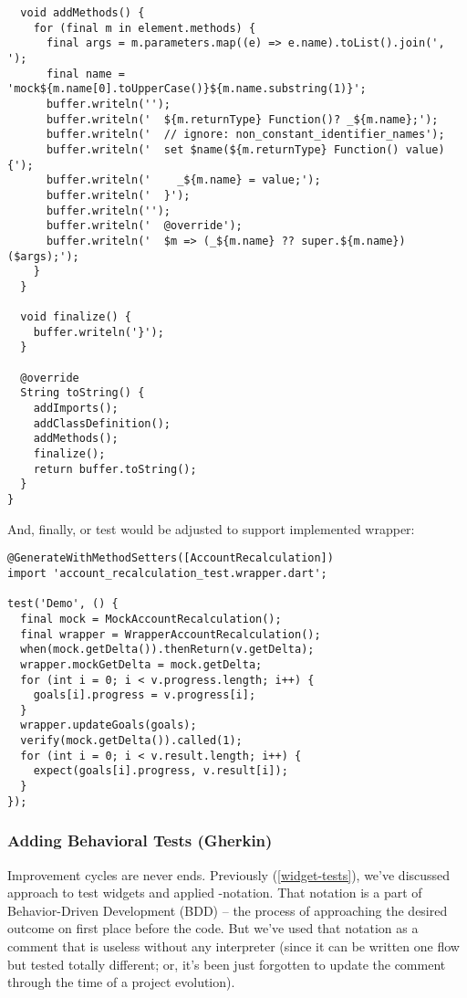 \begin{lstlisting}
  void addMethods() {
    for (final m in element.methods) {
      final args = m.parameters.map((e) => e.name).toList().join(', ');
      final name = 'mock${m.name[0].toUpperCase()}${m.name.substring(1)}';
      buffer.writeln('');
      buffer.writeln('  ${m.returnType} Function()? _${m.name};');
      buffer.writeln('  // ignore: non_constant_identifier_names');
      buffer.writeln('  set $name(${m.returnType} Function() value) {');
      buffer.writeln('    _${m.name} = value;');
      buffer.writeln('  }');
      buffer.writeln('');
      buffer.writeln('  @override');
      buffer.writeln('  $m => (_${m.name} ?? super.${m.name})($args);');
    }
  }

  void finalize() {
    buffer.writeln('}');
  }

  @override
  String toString() {
    addImports();
    addClassDefinition();
    addMethods();
    finalize();
    return buffer.toString();
  }
}
\end{lstlisting}

\noindent And, finally, or test would be adjusted to support implemented wrapper:

\begin{lstlisting}
@GenerateWithMethodSetters([AccountRecalculation])
import 'account_recalculation_test.wrapper.dart';

test('Demo', () {
  final mock = MockAccountRecalculation();
  final wrapper = WrapperAccountRecalculation();
  when(mock.getDelta()).thenReturn(v.getDelta);
  wrapper.mockGetDelta = mock.getDelta;
  for (int i = 0; i < v.progress.length; i++) {
    goals[i].progress = v.progress[i];
  }
  wrapper.updateGoals(goals);
  verify(mock.getDelta()).called(1);
  for (int i = 0; i < v.result.length; i++) {
    expect(goals[i].progress, v.result[i]);
  }
});
\end{lstlisting}


\subsubsection{Adding Behavioral Tests (Gherkin)} \label{t-gherkin}

Improvement cycles are never ends. Previously (\ref{widget-tests}), we've discussed approach to test widgets and applied 
-notation. That notation is a part of Behavior-Driven Development (BDD) -- the process
of approaching the desired outcome on first place before the code. But we've used that notation as a comment that is 
useless without any interpreter (since it can be written one flow but tested totally different; or, it's been just
forgotten to update the comment through the time of a project evolution).

